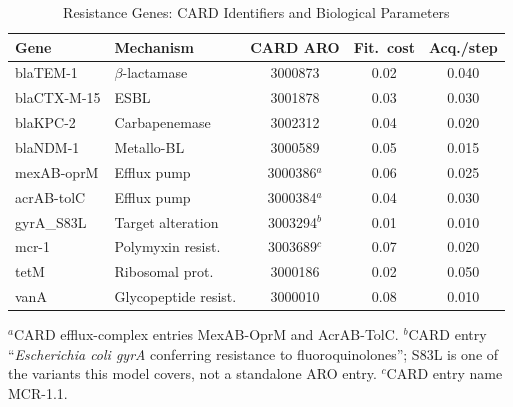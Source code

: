 \begin{table}[!t]
\renewcommand{\arraystretch}{1.15}
\caption{Resistance Genes: CARD Identifiers and Biological Parameters}
\label{tab:genes}
\centering
\scriptsize
\begin{tabular}{@{}llccc@{}}
\toprule
\textbf{Gene} & \textbf{Mechanism} & \textbf{CARD ARO} &
\textbf{Fit.\ cost} & \textbf{Acq./step} \\
\midrule
blaTEM-1    & $\beta$-lactamase   & 3000873         & 0.02 & 0.040 \\
blaCTX-M-15 & ESBL                & 3001878         & 0.03 & 0.030 \\
blaKPC-2    & Carbapenemase       & 3002312         & 0.04 & 0.020 \\
blaNDM-1    & Metallo-BL          & 3000589         & 0.05 & 0.015 \\
mexAB-oprM  & Efflux pump         & 3000386$^{a}$   & 0.06 & 0.025 \\
acrAB-tolC  & Efflux pump         & 3000384$^{a}$   & 0.04 & 0.030 \\
gyrA\_S83L  & Target alteration   & 3003294$^{b}$   & 0.01 & 0.010 \\
mcr-1       & Polymyxin resist.   & 3003689$^{c}$   & 0.07 & 0.020 \\
tetM        & Ribosomal prot.     & 3000186         & 0.02 & 0.050 \\
vanA        & Glycopeptide resist.& 3000010         & 0.08 & 0.010 \\
\bottomrule
\end{tabular}
\vspace{2pt}
\footnotesize{$^{a}$CARD efflux-complex entries MexAB-OprM and AcrAB-TolC.
$^{b}$CARD entry ``\textit{Escherichia coli gyrA} conferring resistance to
fluoroquinolones''; S83L is one of the variants this model covers, not a
standalone ARO entry. $^{c}$CARD entry name MCR-1.1.}
\end{table}
